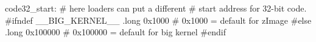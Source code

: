 \documentclass[varwidth=28em,crop]{standalone}
\begin{document}
\begin{gascode}
code32_start: # here loaders can put a different
              # start address for 32-bit code.
#ifndef __BIG_KERNEL__
      .long 0x1000   # 0x1000 = default for zImage
#else
      .long 0x100000 # 0x100000 = default for big kernel
#endif
\end{gascode}
\end{document}
